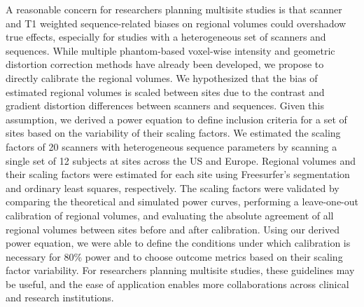 
A reasonable concern for researchers planning multisite studies is that scanner and T1 weighted sequence-related biases on regional volumes could overshadow true effects, especially for studies with a heterogeneous set of scanners and sequences. While multiple phantom-based voxel-wise intensity and geometric distortion correction methods have already been developed, we propose to directly calibrate the regional volumes. We hypothesized that the bias of estimated regional volumes is scaled between sites due to the contrast and gradient distortion differences between scanners and sequences. Given this assumption, we derived a power equation to define inclusion criteria for a set of sites based on the variability of their scaling factors. We estimated the scaling factors of 20 scanners with heterogeneous sequence parameters by scanning a single set of 12 subjects at sites across the US and Europe. Regional volumes and their scaling factors were estimated for each site using Freesurfer's segmentation and ordinary least squares, respectively. The scaling factors were validated by comparing the theoretical and simulated power curves, performing a leave-one-out calibration of regional volumes, and evaluating the absolute agreement of all regional volumes between sites before and after calibration. Using our derived power equation, we were able to define the conditions under which calibration is necessary for 80\% power and to choose outcome metrics based on their scaling factor variability. For researchers planning multisite studies, these guidelines may be useful, and the ease of application enables more collaborations across clinical and research institutions.